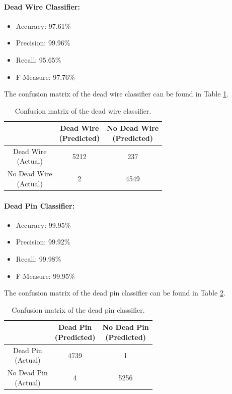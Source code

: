 \paragraph{Dead Wire Classifier:}
\begin{itemize}
  \item Accuracy: 97.61\%
  \item Precision: 99.96\%
  \item Recall: 95.65\%
  \item F-Measure: 97.76\%
\end{itemize}
The confusion matrix of the dead wire classifier can be found in Table
\ref{tbl:confusion-deadwire}.
\begin{table}[h]
  \centering
  \renewcommand\theadfont{\bfseries}
  \begin{tabular}{|c|c|c|}
    \hline
    & \thead{Dead Wire\\(Predicted)} & \thead{No Dead Wire\\(Predicted)} \\
    \hline
    \thead{Dead Wire\\(Actual)} & 5212 & 237\\
    \hline
    \thead{No Dead Wire\\(Actual)} & 2 & 4549\\
    \hline
  \end{tabular}
  \caption{Confusion matrix of the dead wire classifier.}
  \label{tbl:confusion-deadwire}
\end{table}

\paragraph{Dead Pin Classifier:}
\begin{itemize}
  \item Accuracy: 99.95\%
  \item Precision: 99.92\%
  \item Recall: 99.98\%
  \item F-Measure: 99.95\%
\end{itemize}
The confusion matrix of the dead pin classifier can be found in Table
\ref{tbl:confusion-pin}.
\begin{table}[h]
  \centering
  \renewcommand\theadfont{\bfseries}
  \begin{tabular}{|c|c|c|}
    \hline
    & \thead{Dead Pin\\(Predicted)} & \thead{No Dead Pin\\(Predicted)} \\
    \hline
    \thead{Dead Pin\\(Actual)} & 4739 & 1\\
    \hline
    \thead{No Dead Pin\\(Actual)} & 4 & 5256\\
    \hline
  \end{tabular}
  \caption{Confusion matrix of the dead pin classifier.}
  \label{tbl:confusion-pin}
\end{table}

